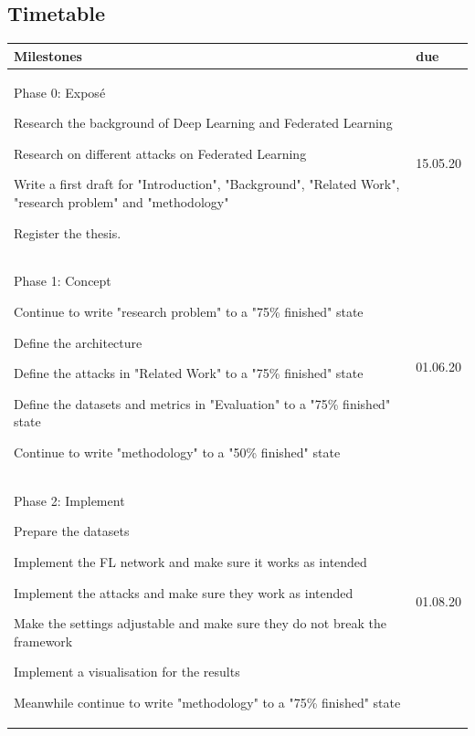\documentclass[
	ngerman,
	ruledheaders=section,%
	class=report,%
	thesis={type=bachelor},%
	accentcolor=1b,%
	custommargins=true,%
	marginpar=false,%
	parskip=half-,%
	fontsize=11pt,%
]{tudapub}
\newenvironment{myitemize}
{ \begin{compactitem}
    \setlength{\itemsep}{0pt}
    \setlength{\parskip}{0pt}
    \setlength{\parsep}{0pt}
    }
{ \end{compactitem}                  }
\begin{document}
\begin{appendix}
 \chapter{Timetable}
 \small
\begin{longtable}[H]{ | L{13cm} | l |} 
\hline
 Milestones & due \\ \hline
 
 Phase 0: Exposé 
 \begin{myitemize}
     \item Research the background of Deep Learning and Federated Learning
     \item Research on different attacks on Federated Learning
     \item Write a first draft for "Introduction", "Background", "Related Work", "research problem" and "methodology"
     \item Register the thesis.
 \end{myitemize}  
 & 15.05.20   \\ \hline
 
 Phase 1: Concept
 \begin{myitemize}
     \item Continue to write "research problem" to a "75\% finished" state
     \item Define the architecture
     \item Define the attacks in "Related Work" to a "75\% finished" state
     \item Define the datasets and metrics in "Evaluation" to a "75\% finished" state
     \item Continue to write "methodology" to a "50\% finished" state
 \end{myitemize}  
 & 01.06.20   \\  \hline
 
 Phase 2: Implement 
 \begin{myitemize}
     \item Prepare the datasets
     \item Implement the FL network and make sure it works as intended
     \item Implement the attacks and make sure they work as intended
     \item Make the settings adjustable and make sure they do not break the framework
     \item Implement a visualisation for the results
     \item Meanwhile continue to write "methodology" to a "75\% finished" state
 \end{myitemize}  
 & 01.08.20   \\  \hline
 

\end{longtable}
\end{appendix}
\end{document}
